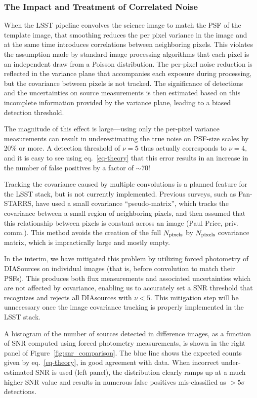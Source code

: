\subsubsection{The Impact and Treatment of Correlated Noise} 

When the LSST pipeline convolves the science image to match the PSF of the template 
image, that smoothing reduces the per pixel variance in the image and at the same
time introduces correlations between neighboring pixels. This violates the
assumption made by standard image processing algorithms that each pixel is an
independent draw from a Poisson distribution. The per-pixel noise reduction is
reflected in the variance plane that accompanies each exposure during
processing, but the covariance between pixels is not tracked. 
The significance of detections and the uncertainties on source measurements is
then estimated based on this incomplete information provided by the variance
plane, leading to a biased detection threshold. 

The magnitude of this effect is large---using only the per-pixel variance
measurements can result in underestimating the true noise on PSF-size scales by
20\% or more. A detection threshold of $\nu=5$ thus actually corresponds to
$\nu=4$, and it is easy to see using eq.~\ref{eq-theory} that this error results
in an increase in the number of false positives by a factor of $\sim$70!

Tracking the covariance caused by multiple convolutions is a planned feature for
the LSST stack, but is not currently implemented. Previous surveys, such as
Pan-STARRS, have used a small covariance ``pseudo-matrix'', which tracks the
covariance between a small region of neighboring pixels, and then assumed that 
this relationship between pixels is constant across an image (Paul Price, priv. comm.).
This method avoids the creation of the full $N_{\rm pixels}$ by $N_{\rm pixels}$
covariance matrix, which is impractically large and mostly empty.

In the interim, we have mitigated this problem by utilizing forced photometry of DIASources
on individual images (that is, before convolution to match their PSFs). This
produces both flux measurements and associated uncertainties which are not
affected by covariance, enabling us to accurately set a SNR threshold
that recognizes and rejects all DIAsources with $\nu < 5$. This mitigation step
will be unnecessary once the image covariance tracking is properly implemented
in the LSST stack. 


A histogram of the number of sources detected in difference images, as a function
of SNR computed using forced photometry measurements, is shown in the right panel 
of Figure~\ref{fig:snr_comparison}. The blue line shows the expected counts given
by eq.~\ref{eq-theory}, in good agreement with data. When incorrect under-estimated 
SNR is used (left panel), the distribution clearly ramps up at a much higher SNR value 
and results in numerous false positives mis-classified as $>5 \sigma$ detections.


